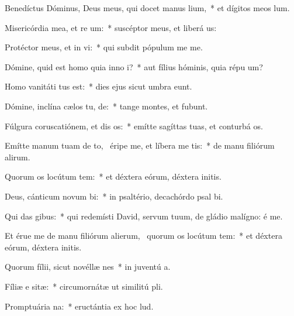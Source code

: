 \item Benedíctus Dóminus, Deus meus, qui docet manus   lium,~* et dígitos meos  lum.
\item Misericórdia mea, et re um:~* suscéptor meus, et liberá us:
\item Protéctor meus, et in  vi:~* qui subdit pópulum me  me.
\item Dómine, quid est homo quia inno i?~* aut fílius hóminis, quia répu um?
\item Homo vanitáti  tus est:~* dies ejus sicut umbra eunt.
\item Dómine, inclína cælos tu,  de:~* tange montes, et fubunt.
\item Fúlgura coruscatiónem, et dis os:~* emítte sagíttas tuas, et conturbá os.
\item Emítte manum tuam de to,~\pscross{} éripe me, et líbera me   tis:~* de manu filiórum alirum.
\item Quorum os locútum  tem:~* et déxtera eórum, déxtera initis.
\item Deus, cánticum novum  bi:~* in psaltério, decachórdo psal bi.
\item Qui das  gibus:~* qui redemísti David, servum tuum, de gládio malígno: é me.
\item Et érue me de manu filiórum alierum,~\pscross{} quorum os locútum  tem:~* et déxtera eórum, déxtera initis.
\item Quorum fílii, sicut novéllæ nes~* in juventú a.
\item Fíliæ e sitæ:~* circumornátæ ut similitú pli.
\item Promptuária  na:~* eructántia ex hoc  lud.
